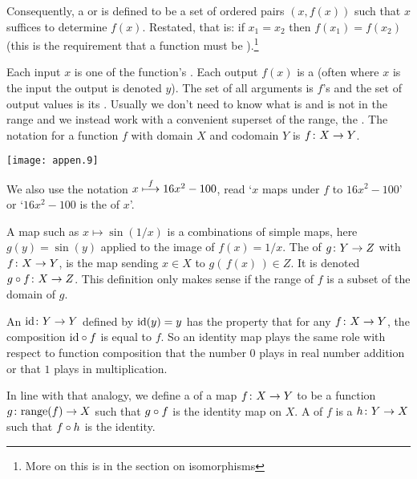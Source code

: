 Consequently, a  
or  is defined
to be a set of ordered pairs \( (x,f(x)) \)
such that \( x \) suffices to determine \( f(x) \).
Restated, that is:
if \( x_1=x_2 \) then \( f(x_1)=f(x_2) \)
(this is the requirement that a
function must be %
).\footnote{More on this is in the section
on isomorphisms}

Each input \( x \) is one of the function's 
. 
Each output \( f(x) \) is a 
(often where $x$ is the input the output is denoted $y$).
The set of all arguments is \( f \)'s 
and the set of output values is its 
.
Usually we don't need to know what is and is not in the range and we instead
work with a convenient superset of the range, the
.
The notation for a function \( f \) with domain \( X \) and codomain \( Y \) is
\( \mbox{$f\colon X\to Y$} \).
\begin{center}
  \texttt{[image: appen.9]}
\end{center}
We also use the notation \( x\stackrel{f}{\longmapsto} 16x^2-100 \), read
`\( x \) maps under \( f \) to \( 16x^2-100 \)' or
`\( 16x^2-100 \) is the  
of \( x \)'.

A map such as \( x\mapsto \sin(1/x) \) is a
combinations of simple maps, here
\( g(y)=\sin(y) \) applied to the image of \( f(x)=1/x \).
The  
of \( \mbox{$g\colon Y\to Z$} \) with \( \mbox{$f\colon X\to Y$} \),
is the map sending
\( x\in X \) to \( g(\, f(x)\,)\in Z \).
It is denoted \( \mbox{$g\mathbin\circ f\colon X\to Z$} \).
This definition only makes sense if the range of \( f \) is a
subset of the domain of \( g \).

An 
\( \mbox{$\mbox{id}\colon Y\to Y$} \) defined by
\( \mbox{id}(y)=y \) has the property that for any \( \mbox{$f\colon X\to Y$} \),
the composition \( \mbox{id}\mathbin\circ f \) is equal to \( f \).
So an identity map plays the same role with respect to function composition
that the number \( 0 \) plays in real number addition or that 
\( 1 \) plays in multiplication.

In line with that analogy, we define a
 of a map 
\( \mbox{$f\colon X\to Y$} \) to be a
function \( \mbox{$g\colon \text{range}(f)\to X$} \) such that \( g\mathbin\circ f \)
is the identity map on \( X \).
A  of \( f \) is a
\( \mbox{$h\colon Y\to X$} \) such that \( f\mathbin\circ h \) is the identity.

